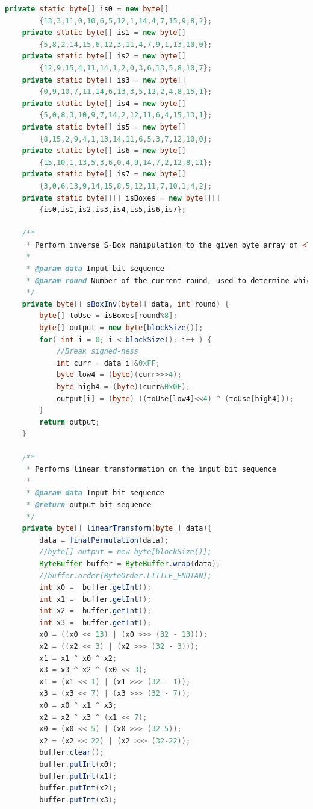 \documentclass[12pt]{article} %
\begin{document}
\begin{lstlisting}[language=Java, basicstyle=\small, breaklines=true]
    private static byte[] is0 = new byte[]
        {13,3,11,0,10,6,5,12,1,14,4,7,15,9,8,2};
    private static byte[] is1 = new byte[]
        {5,8,2,14,15,6,12,3,11,4,7,9,1,13,10,0};
    private static byte[] is2 = new byte[]
        {12,9,15,4,11,14,1,2,0,3,6,13,5,8,10,7};
    private static byte[] is3 = new byte[]
        {0,9,10,7,11,14,6,13,3,5,12,2,4,8,15,1};
    private static byte[] is4 = new byte[]
        {5,0,8,3,10,9,7,14,2,12,11,6,4,15,13,1};
    private static byte[] is5 = new byte[]
        {8,15,2,9,4,1,13,14,11,6,5,3,7,12,10,0};
    private static byte[] is6 = new byte[]
        {15,10,1,13,5,3,6,0,4,9,14,7,2,12,8,11};
    private static byte[] is7 = new byte[]
        {3,0,6,13,9,14,15,8,5,12,11,7,10,1,4,2};
    private static byte[][] isBoxes = new byte[][]
        {is0,is1,is2,is3,is4,is5,is6,is7};    

    /**
     * Perform inverse S-Box manipulation to the given byte array of <TT>blocksize()</TT> length.
     *
     * @param data Input bit sequence
     * @param round Number of the current round, used to determine which inverted S-Box to use.
     */
    private byte[] sBoxInv(byte[] data, int round) {
        byte[] toUse = isBoxes[round%8];
        byte[] output = new byte[blockSize()];
        for( int i = 0; i < blockSize(); i++ ) {
            //Break signed-ness
            int curr = data[i]&0xFF;
            byte low4 = (byte)(curr>>>4);
            byte high4 = (byte)(curr&0x0F);
            output[i] = (byte) ((toUse[low4]<<4) ^ (toUse[high4]));
        }
        return output;
    }
    
    /**
     * Performs linear transformation on the input bit sequence
     * 
     * @param data Input bit sequence
     * @return output bit sequence
     */
    private byte[] linearTransform(byte[] data){
    	data = finalPermutation(data);
    	//byte[] output = new byte[blockSize()];
    	ByteBuffer buffer = ByteBuffer.wrap(data);
    	//buffer.order(ByteOrder.LITTLE_ENDIAN);
    	int x0 =  buffer.getInt();
    	int x1 =  buffer.getInt();
    	int x2 =  buffer.getInt();
    	int x3 =  buffer.getInt();
    	x0 = ((x0 << 13) | (x0 >>> (32 - 13)));	
    	x2 = ((x2 << 3) | (x2 >>> (32 - 3)));
    	x1 = x1 ^ x0 ^ x2;
    	x3 = x3 ^ x2 ^ (x0 << 3);
    	x1 = (x1 << 1) | (x1 >>> (32 - 1));
    	x3 = (x3 << 7) | (x3 >>> (32 - 7));
    	x0 = x0 ^ x1 ^ x3;
    	x2 = x2 ^ x3 ^ (x1 << 7);
    	x0 = (x0 << 5) | (x0 >>> (32-5));
    	x2 = (x2 << 22) | (x2 >>> (32-22));
    	buffer.clear();
    	buffer.putInt(x0);
    	buffer.putInt(x1);
    	buffer.putInt(x2);
    	buffer.putInt(x3);
    	

\end{lstlisting}
\end{document}
